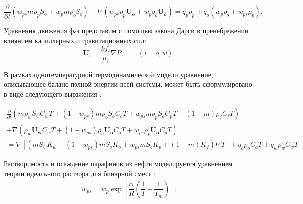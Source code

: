 \documentclass[12pt,twoside,a4paper]{uz_ku}
\begin{document}
\begin{equation}\label{eq3}
\frac{\partial}{\partial t}(w_{ps} m \rho_p S_o + w_p  m \rho_o S_o) + \nabla(w_{ps}  \rho_p \mathbf{U_o} + w_p \rho_o \mathbf{U_o}) = q_p \rho_p + q_o (w_p \rho_o + w_{ps} \rho_p).
\end{equation}

	Уравнения движения фаз представим с помощью закона Дарси в пренебрежении влиянием капиллярных и гравитационных сил:
\begin{equation}\label{eq4}
\mathbf{U_i} = \frac{k f_i}{\mu_i} \nabla P,  \qquad (i=o,w).
\end{equation}

	В рамках однотемпературной термодинамической модели  уравнение, описывающее баланс полной энергии всей системы, может быть сформулировано в виде следующего выражения \cite{4}:

\begin{multline}\label{eq5}
\frac{\partial }
{\partial t}(m \rho_w S_w C_w T +(1-w_{ps})m \rho_o S_o C_o T + 
w_{ps}m \rho_p S_o C_p T +(1-m) \rho_f C_f T) + 
\\
+\nabla(\rho_w \mathbf{U_w} C_w T + (1-w_{ps}) \rho_o \mathbf{U_o} C_o T + w_{ps}\rho_p \mathbf{U_o} C_p T) = 
\\
=\nabla [(m S_w K_w + (1-w_{ps}) m S_o K_o  + w_{ps} m S_o K_p + (1-m) K_f) \nabla T ] + q_o \rho_o C_o T + q_w \rho_w C_w T
\end{multline}

Растворимость и осаждение парафинов из нефти моделируется уравнением теории идеального раствора для бинарной смеси \cite{4}:
\begin{equation} \label{eq6}
w_{ps} = w_p \exp[\frac{\alpha}{R}(\frac{1}{T} - \frac{1}{T_m})]. 
\end{equation}
\end{document}
